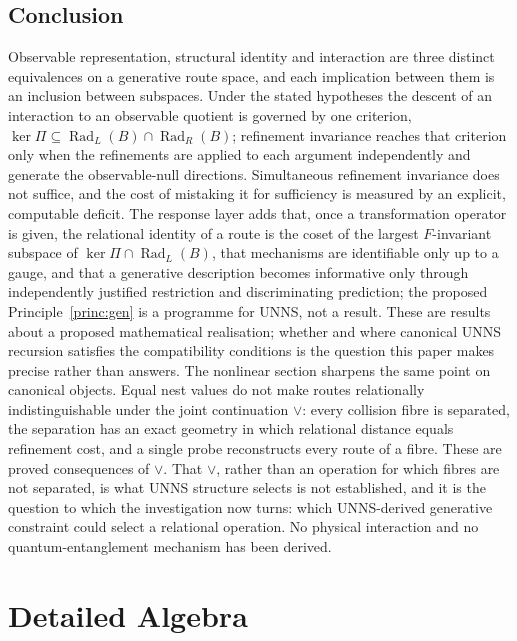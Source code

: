 \documentclass[11pt,a4paper]{article}
\newcommand{\Rad}{\operatorname{Rad}}
\newcommand{\vj}{\mathbin{\vee}}
\theoremstyle{plain}
\theoremstyle{definition}
\begin{document}
\subsection{Conclusion}
Observable representation, structural identity and interaction are three distinct equivalences on a generative route space, and each implication between them is an inclusion between subspaces. Under the stated hypotheses the descent of an interaction to an observable quotient is governed by one criterion, $\ker\Pi\subseteq\Rad_L(B)\cap\Rad_R(B)$; refinement invariance reaches that criterion only when the refinements are applied to each argument independently and generate the observable-null directions. Simultaneous refinement invariance does not suffice, and the cost of mistaking it for sufficiency is measured by an explicit, computable deficit. The response layer adds that, once a transformation operator is given, the relational identity of a route is the coset of the largest $F$-invariant subspace of $\ker\Pi\cap\Rad_L(B)$, that mechanisms are identifiable only up to a gauge, and that a generative description becomes informative only through independently justified restriction and discriminating prediction; the proposed Principle~\ref{princ:gen} is a programme for UNNS, not a result. These are results about a proposed mathematical realisation; whether and where canonical UNNS recursion satisfies the compatibility conditions is the question this paper makes precise rather than answers.
The nonlinear section sharpens the same point on canonical objects. Equal nest values do not make routes relationally indistinguishable under the joint continuation $\vj$: every collision fibre is separated, the separation has an exact geometry in which relational distance equals refinement cost, and a single probe reconstructs every route of a fibre. These are proved consequences of $\vj$. That $\vj$, rather than an operation for which fibres are not separated, is what UNNS structure selects is not established, and it is the question to which the investigation now turns: which UNNS-derived generative constraint could select a relational operation. No physical interaction and no quantum-entanglement mechanism has been derived.

\appendix
\section{Detailed Algebra}\label{app:algebra}
\end{document}
